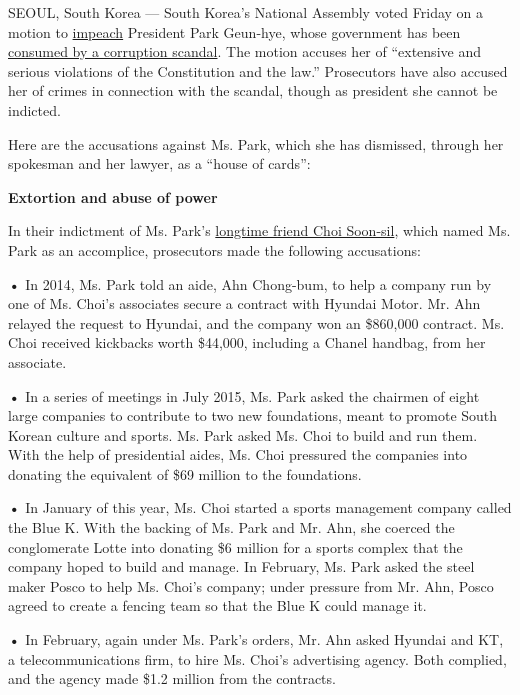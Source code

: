 SEOUL, South Korea --- South Korea's National Assembly voted Friday on a
motion to
\href{http://www.nytimes3xbfgragh.onion/2016/12/09/world/asia/south-korea-president-park-geun-hye-impeached.html}{impeach}
President Park Geun-hye, whose government has been
\href{http://www.nytimes3xbfgragh.onion/2016/12/06/world/asia/park-geun-hye-south-korea-april.html}{consumed
by a corruption scandal}. The motion accuses her of ``extensive and
serious violations of the Constitution and the law.'' Prosecutors have
also accused her of crimes in connection with the scandal, though as
president she cannot be indicted.

Here are the accusations against Ms. Park, which she has dismissed,
through her spokesman and her lawyer, as a ``house of cards'':

\textbf{Extortion and abuse of power}

In their indictment of Ms. Park's
\href{https://www.nytimes3xbfgragh.onion/2016/11/01/world/asia/south-korea-park-geun-hye-choi-soon-sil.html}{longtime
friend Choi Soon-sil}, which named Ms. Park as an accomplice,
prosecutors made the following accusations:

\textbf{•} In 2014, Ms. Park told an aide, Ahn Chong-bum, to help a
company run by one of Ms. Choi's associates secure a contract with
Hyundai Motor. Mr. Ahn relayed the request to Hyundai, and the company
won an \$860,000 contract. Ms. Choi received kickbacks worth \$44,000,
including a Chanel handbag, from her associate.

\textbf{•} In a series of meetings in July 2015, Ms. Park asked the
chairmen of eight large companies to contribute to two new foundations,
meant to promote South Korean culture and sports. Ms. Park asked Ms.
Choi to build and run them. With the help of presidential aides, Ms.
Choi pressured the companies into donating the equivalent of \$69
million to the foundations.

\textbf{•} In January of this year, Ms. Choi started a sports management
company called the Blue K. With the backing of Ms. Park and Mr. Ahn, she
coerced the conglomerate Lotte into donating \$6 million for a sports
complex that the company hoped to build and manage. In February, Ms.
Park asked the steel maker Posco to help Ms. Choi's company; under
pressure from Mr. Ahn, Posco agreed to create a fencing team so that the
Blue K could manage it.

\textbf{•} In February, again under Ms. Park's orders, Mr. Ahn asked
Hyundai and KT, a telecommunications firm, to hire Ms. Choi's
advertising agency. Both complied, and the agency made \$1.2 million
from the contracts.

